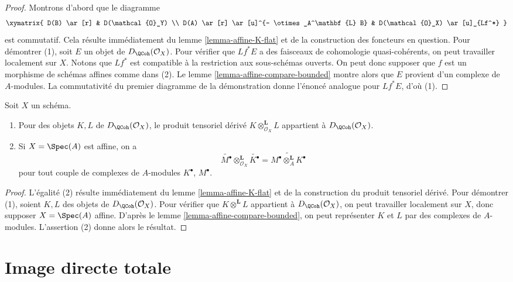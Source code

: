 \begin{proof}
Montrons d'abord que le diagramme
$$
\xymatrix{
D(B) \ar[r] & D(\mathcal{O}_Y) \\
D(A) \ar[r] \ar[u]^{- \otimes_A^\mathbf{L} B} &
D(\mathcal{O}_X) \ar[u]_{Lf^*}
}
$$
est commutatif. Cela résulte immédiatement du lemme \ref{lemma-affine-K-flat} et
de la construction des foncteurs en question. Pour démontrer (1), soit
$E$ un objet de $D_\QCoh(\mathcal{O}_X)$. Pour vérifier que
$Lf^*E$ a des faisceaux de cohomologie quasi-cohérents, on peut travailler localement sur $X$.
Notons que $Lf^*$ est compatible à la restriction aux sous-schémas ouverts.
On peut donc supposer que $f$ est un morphisme de schémas affines comme dans (2).
Le lemme \ref{lemma-affine-compare-bounded} montre alors que
$E$ provient d'un complexe de $A$-modules. La commutativité du premier
diagramme de la démonstration donne l'énoncé analogue pour $Lf^*E$, d'où (1).
\end{proof}

\begin{lemma}
\label{lemma-quasi-coherence-tensor-product}
Soit $X$ un schéma.
\begin{enumerate}
\item Pour des objets $K, L$ de $D_\QCoh(\mathcal{O}_X)$,
le produit tensoriel dérivé $K \otimes^\mathbf{L}_{\mathcal{O}_X} L$ appartient à
$D_\QCoh(\mathcal{O}_X)$.
\item Si $X = \Spec(A)$ est affine, on a
$$
\widetilde{M^\bullet} \otimes_{\mathcal{O}_X}^\mathbf{L} \widetilde{K^\bullet}
=
\widetilde{M^\bullet \otimes_A^\mathbf{L} K^\bullet}
$$
pour tout couple de complexes de $A$-modules $K^\bullet$, $M^\bullet$.
\end{enumerate}
\end{lemma}

\begin{proof}
L'égalité (2) résulte immédiatement du lemme \ref{lemma-affine-K-flat}
et de la construction du produit tensoriel dérivé.
Pour démontrer (1), soient $K, L$ des objets de $D_\QCoh(\mathcal{O}_X)$.
Pour vérifier que $K \otimes^\mathbf{L} L$ appartient à
$D_\QCoh(\mathcal{O}_X)$, on peut travailler localement sur $X$, donc
supposer $X = \Spec(A)$ affine. D'après
le lemme \ref{lemma-affine-compare-bounded}, on peut représenter
$K$ et $L$ par des complexes de $A$-modules. L'assertion (2) donne alors
le résultat.
\end{proof}



\section{Image directe totale}
\label{section-total-direct-image}

